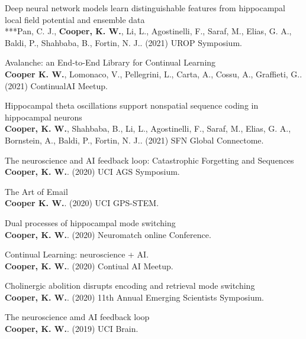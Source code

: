 \documentclass[10pt]{cooperCV2}
\begin{document}
 
\begin{etaremune}[itemindent=-1.5\bibhang, topsep=0pt,
				   itemsep=\bibsep,partopsep=0pt,parsep=0pt,leftmargin={\bibhang+\widthof{[999]}}] 
    
    \item Deep neural network models learn distinguishable features from hippocampal local field potential and ensemble data\\ ***Pan, C. J., \textbf{Cooper, K. W.}, Li, L., Agostinelli, F., Saraf, M., Elias, G. A., Baldi, P.,  Shahbaba, B., Fortin, N. J.. (2021) UROP Symposium. 
     
	
    \item Avalanche: an End-to-End Library for Continual Learning\\ \textbf{Cooper K. W.}, Lomonaco, V., Pellegrini, L., Carta, A., Cossu, A., Graffieti, G.. (2021) ContinualAI Meetup. 
     
	
    \item Hippocampal theta oscillations support nonspatial sequence coding in hippocampal neurons\\ \textbf{Cooper, K. W.}, Shahbaba, B., Li, L., Agostinelli, F., Saraf, M., Elias, G. A., Bornstein, A., Baldi, P.,  Fortin, N. J.. (2021) SFN Global Connectome. 
     
	
    \item The neuroscience and AI feedback loop: Catastrophic Forgetting and Sequences\\ \textbf{Cooper, K. W.}. (2020) UCI AGS Symposium. 
     
	
    \item The Art of Email\\ \textbf{Cooper K. W.}. (2020) UCI GPS-STEM. 
     
	
    \item Dual processes of hippocampal mode switching\\ \textbf{Cooper, K. W.}. (2020) Neuromatch online Conference. 
     
	
    \item Continual Learning: neuroscience + AI.\\ \textbf{Cooper, K. W.}. (2020) Contiual AI Meetup. 
     
	
    \item Cholinergic abolition disrupts encoding and retrieval mode switching\\ \textbf{Cooper, K. W.}. (2020) 11th Annual Emerging Scientists Symposium. 
     
	
    \item The neuroscience amd AI feedback loop\\ \textbf{Cooper, K. W.}. (2019) UCI Brain. 
     

\end{etaremune}
\end{document}
